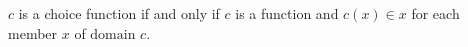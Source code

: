 $c$ is a choice function if and only if $c$ is a function and $c(x) \in x$ for each member $x$ of $\text{domain } c$.
